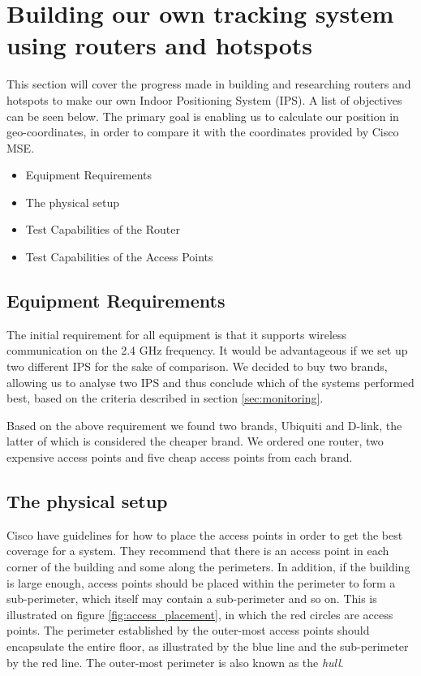 \section{Building our own tracking system using routers and hotspots}
This section will cover the progress made in building and researching routers and hotspots to make our own Indoor Positioning System (IPS). A list of objectives can be seen below. The primary goal is enabling us to calculate our position in geo-coordinates, in order to compare it with the coordinates provided by Cisco MSE.

\begin{itemize}
	\item Equipment Requirements
	\item The physical setup
	\item Test Capabilities of the Router
	\item Test Capabilities of the Access Points
\end{itemize}

\subsection*{Equipment Requirements}
The initial requirement for all equipment is that it supports wireless communication on the 2.4 GHz frequency. It would be advantageous if we set up two different IPS for the sake of comparison. We decided to buy two brands, allowing us to analyse two IPS and thus conclude which of the systems performed best, based on the criteria described in section \ref{sec:monitoring}.

Based on the above requirement we found two brands, Ubiquiti and D-link, the latter of which is considered the cheaper brand. We ordered one router, two expensive access points and five cheap access points from each brand.

\subsection*{The physical setup}
Cisco\cite{access_point_placement} have guidelines for how to place the access points in order to get the best coverage for a system. They recommend that there is an access point in each corner of the building and some along the perimeters. In addition, if the building is large enough, access points should be placed within the perimeter to form a sub-perimeter, which itself may contain a sub-perimeter and so on. This is illustrated on figure \cref{fig:access_placement}, in which the red circles are access points. The perimeter established by the outer-most access points should encapsulate the entire floor, as illustrated by the blue line and the sub-perimeter by the red line. The outer-most perimeter is also known as the \textit{hull}\cite{access_point_placement}.

